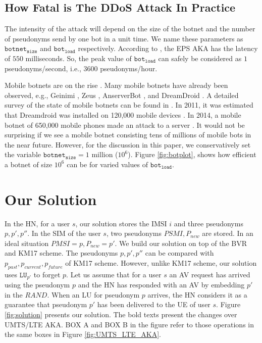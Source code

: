 \documentclass{llncs} %
\begin{document}
\subsection{How Fatal is The DDoS Attack In Practice} \label{sec:how_fatal_ddos}
The intensity of the attack will depend on the size of the botnet and the number of pseudonyms send by one bot in a unit time. We name these parameters as $\texttt{botnet}_{\texttt{size}}$ and $\texttt{bot}_{\texttt{load}}$ respectively. According to \cite{thesislund}, the EPS AKA has the latency of $550$ milliseconds. So, the peak value of $\texttt{bot}_{\texttt{load}}$ can safely be considered as $1$ pseudonyms/second, i.e., 3600 pseudonyms/hour.

Mobile botnets are on the rise \cite{botnet_ccs09_symbian,botnet_usenix11,botnet_australia_2016}. Many mobile botnets have already been observed, e.g., Geinimi \cite{botnet_geinimi10}, Zeus \cite{botnet_zeus11}, AnserverBot \cite{botnet_anserverbot}, and DreamDroid \cite{botnet_dreamdroid11}. A detailed survey of the state of mobile botnets can be found in \cite{botnet_threat15}. In 2011, it was estimated that Dreamdroid was installed on 120,000 mobile devices \cite{botnet_dreamdroid11}. In 2014, a mobile botnet of 650,000 mobile phones made an attack to a server \cite{chinese_spam}. It would not be surprising if we see a mobile botnet consisting tens of millions of mobile bots in the near future. However, for the discussion in this paper, we conservatively set the variable $\texttt{botnet}_{\texttt{size}} = 1$ million ($10^6$). Figure \ref{fig:botplot}, shows how efficient a botnet of size $10^6$ can be for varied values of $\texttt{bot}_{\texttt{load}}$. 



\section{Our Solution}
In the HN, for a user $s$, our solution stores the IMSI $i$ and three pseudonyms $p,p',p''$. In the SIM of the user $s$, two pseudonyms $PSMI,P_{new}$ are stored. In an ideal situation $PMSI = p, P_{new} = p'$. We build our solution on top of the BVR and KM17 scheme. The pseudonyms $p,p',p''$ can be compared with $p_{past},p_{current},p_{future}$ of KM17 scheme. However, unlike KM17 scheme, our solution uses $\texttt{LU}_{p'}$ to forget $p$. Let us assume that for a user $s$ an AV request has arrived using the pseudonym $p$ and the HN has responded with an AV by embedding $p'$ in the $RAND$. When an LU for pseudonym $p$ arrives, the HN considers it as a guarantee that pseudonym $p'$ has been delivered to the UE of user $s$.  Figure \ref{fig:solution} presents our solution. The bold texts present the changes over UMTS/LTE AKA. BOX A and BOX B in the figure refer to those operations in the same boxes in Figure \ref{fig:UMTS_LTE_AKA}.
\end{document}
